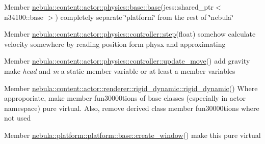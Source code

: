 \label{todo__todo000001}
\hypertarget{todo__todo000001}{}
 
\begin{DoxyDescription}
\item[Member \hyperlink{classnebula_1_1content_1_1actor_1_1physics_1_1base_afd89cccbffae63f75ac2dc601a9a5870}{nebula::content::actor::physics::base::base}(jess::shared\_\-ptr$<$ n34100::base $>$) ]completely separate \char`\"{}platform\char`\"{} from the rest of \char`\"{}nebula\char`\"{} 
\end{DoxyDescription}

\label{todo__todo000002}
\hypertarget{todo__todo000002}{}
 
\begin{DoxyDescription}
\item[Member \hyperlink{classnebula_1_1content_1_1actor_1_1physics_1_1controller_a76e049f3e302ed369ed9d2820487cc3e}{nebula::content::actor::physics::controller::step}(float) ]somehow calculate velocity somewhere by reading position form physx and approximating 
\end{DoxyDescription}

\label{todo__todo000003}
\hypertarget{todo__todo000003}{}
 
\begin{DoxyDescription}
\item[Member \hyperlink{classnebula_1_1content_1_1actor_1_1physics_1_1controller_ad2a4afb425a1aade9cbdd8ae8da99f47}{nebula::content::actor::physics::controller::update\_\-move}() ]add gravity make {\itshape head\/} and {\itshape m\/} a static member variable or at least a member variables 
\end{DoxyDescription}

\label{todo__todo000004}
\hypertarget{todo__todo000004}{}
 
\begin{DoxyDescription}
\item[Member \hyperlink{classnebula_1_1content_1_1actor_1_1renderer_1_1rigid__dynamic_a1769b910cd702811d55a80c4d37b3df9}{nebula::content::actor::renderer::rigid\_\-dynamic::rigid\_\-dynamic}() ]Where approporiate, make member fun30000tions of base classes (especially in actor namespace) pure virtual. Also, remove derived class member fun30000tions where not used 
\end{DoxyDescription}

\label{todo__todo000005}
\hypertarget{todo__todo000005}{}
 
\begin{DoxyDescription}
\item[Member \hyperlink{classnebula_1_1platform_1_1platform_1_1base_a3ea2aaff05ce1406a0fd0e72bdc7074c}{nebula::platform::platform::base::create\_\-window}() ]make this pure virtual 
\end{DoxyDescription}

